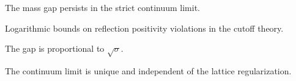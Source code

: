 \begin{conjecture}
\label{conj:continuum-gap}
The mass gap persists in the strict continuum limit.
\end{conjecture}

\begin{lemma}
\label{lem:log-rp-bound}
Logarithmic bounds on reflection positivity violations in the cutoff theory.
\end{lemma}

\begin{conjecture}
\label{conj:gap-sigma}
The gap is proportional to $\sqrt{\sigma}$.
\end{conjecture}

\begin{conjecture}
\label{conj:continuum-limit}
The continuum limit is unique and independent of the lattice regularization.
\end{conjecture}




